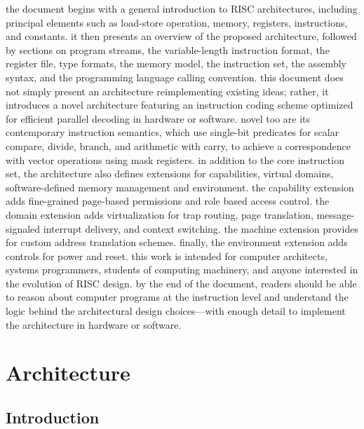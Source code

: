 \par\noindent
the document begins with a general introduction to RISC architectures,
including principal elements such as load-store operation, memory,
registers, instructions, and constants. it then presents an overview of
the proposed architecture, followed by sections on program streams, the
variable-length instruction format, the register file, type formats,
the memory model, the instruction set, the assembly syntax, and the
programming language calling convention.
\para
this document does not simply present an architecture reimplementing
existing ideas; rather, it introduces a novel architecture featuring an
instruction coding scheme optimized for efficient parallel decoding in
hardware or software. novel too are its contemporary instruction semantics,
which use single-bit predicates for scalar compare, divide, branch, and
arithmetic with carry, to achieve a correspondence with vector operations
using mask registers.
\para
in addition to the core instruction set, the architecture also defines
extensions for capabilities, virtual domains, software-defined memory
management and environment. the capability extension adds fine-grained
page-based permissions and role based access control. the domain
extension adds virtualization for trap routing, page translation,
message-signaled interrupt delivery, and context switching. the machine
extension provides for custom address translation schemes. finally,
the environment extension adds controls for power and reset.
\para
this work is intended for computer architects, systems programmers,
students of computing machinery, and anyone interested in the evolution
of RISC design. by the end of the document, readers should be able to
reason about computer programs at the instruction level and understand
the logic behind the architectural design choices—with enough detail
to implement the architecture in hardware or software.

\chapter{Architecture}

\section{Introduction}

